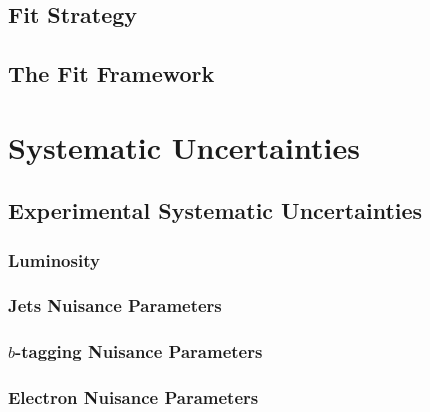 \documentclass[10pt,twoside,cucitura,classica,english,openany]{toptesi}
\begin{document}


\subsection{Fit Strategy}
\label{sec:fit-strategy}



\subsection{The Fit Framework}
\label{sec:fit-framework}



\section{Systematic Uncertainties}
\label{sec:syst-uncert-1}



\subsection{Experimental Systematic Uncertainties}
\label{sec:exper-syst-uncert}



\subsubsection{Luminosity}
\label{sec:luminosity}



\subsubsection{Jets Nuisance Parameters}
\label{sec:jets-nuis-param}



\subsubsection{$b$-tagging Nuisance Parameters}
\label{sec:b-tagging-nuisance}



\subsubsection{Electron Nuisance Parameters}
\label{sec:electr-nuis-param}
\end{document}
